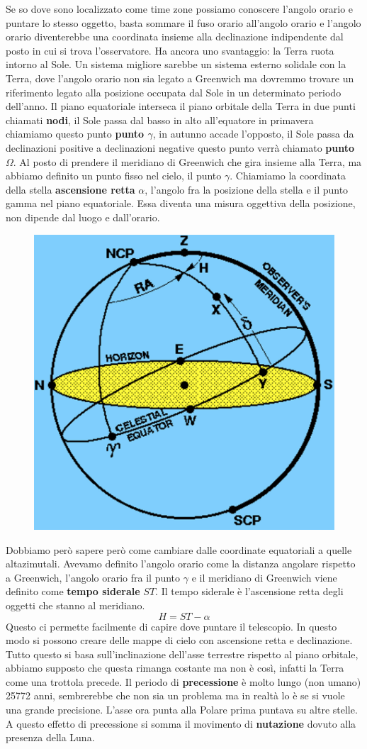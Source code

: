\documentclass[a4paper,11pt]{article}
\begin{document}
Se so dove sono localizzato come time zone possiamo conoscere l'angolo orario e puntare lo stesso oggetto, basta sommare il fuso orario all'angolo orario e l'angolo orario diventerebbe una coordinata insieme alla declinazione indipendente dal posto in cui si trova l'osservatore. Ha ancora uno svantaggio: la Terra ruota intorno al Sole. Un sistema migliore sarebbe un sistema esterno solidale con la Terra, dove l'angolo orario non sia legato a Greenwich ma dovremmo trovare un riferimento legato alla posizione occupata dal Sole in un determinato periodo dell'anno. Il piano equatoriale interseca il piano orbitale della Terra in due punti chiamati \textbf{nodi}, il Sole passa dal basso in alto all'equatore in primavera chiamiamo questo punto \textbf{punto $\gamma$}, in autunno  accade l'opposto, il Sole passa da declinazioni positive a declinazioni negative questo punto verrà chiamato \textbf{punto $\Omega$}. Al posto di prendere il meridiano di Greenwich che gira insieme alla Terra, ma abbiamo definito un punto fisso nel cielo, il punto $\gamma$. Chiamiamo la coordinata della stella \textbf{ascensione retta} $\alpha$, l'angolo fra la posizione della stella e il punto gamma nel piano equatoriale. Essa diventa una misura oggettiva della posizione, non dipende dal luogo e dall'orario. 
\begin{figure}[ht]
    \centering
    \includegraphics[width=5 cm]{Coordinate equatoriali.png}
\end{figure}
Dobbiamo però sapere però come cambiare dalle coordinate equatoriali a quelle altazimutali. Avevamo definito l'angolo orario come la distanza angolare rispetto a Greenwich, l'angolo orario fra il punto $\gamma$ e il meridiano di Greenwich viene definito come \textbf{tempo siderale} $ST$. Il tempo siderale è l'ascensione retta degli oggetti che stanno al meridiano.
$$H=ST-\alpha$$
Questo ci permette facilmente di capire dove puntare il telescopio. In questo modo si possono creare delle mappe di cielo con ascensione retta e declinazione.\\
Tutto questo si basa sull'inclinazione dell'asse terrestre rispetto al piano orbitale, abbiamo supposto che questa rimanga costante ma non è così, infatti la Terra come una trottola precede. Il periodo di \textbf{precessione} è molto lungo (non umano) 25772 anni, sembrerebbe che non sia un problema ma in realtà lo è se si vuole una grande precisione. L'asse ora punta alla Polare prima puntava su altre stelle. A questo effetto di precessione si somma il movimento di \textbf{nutazione} dovuto alla presenza della Luna.
\end{document}
